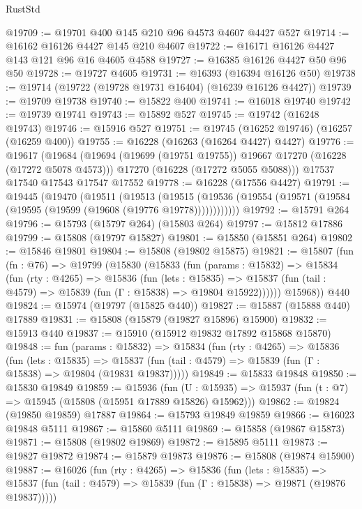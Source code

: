 \begin{lexlean}{RustStd}
\begin{coremodule}
@19709 := @19701 @400 @145 @210 @96 @4573 @4607 @4427 @527
@19714 := @16162 @16126 @4427 @145 @210 @4607
@19722 := @16171 @16126 @4427 @143 @121 @96 @16 @4605 @4588
@19727 := @16385 @16126 @4427 @50 @96 @50
@19728 := @19727 @4605
@19731 := @16393 (@16394 @16126 @50)
@19738 := @19714 (@19722 (@19728 @19731 @16404) (@16239 @16126 @4427))
@19739 := @19709 @19738
@19740 := @15822 @400
@19741 := @16018 @19740
@19742 := @19739 @19741
@19743 := @15892 @527
@19745 := @19742 (@16248 @19743)
@19746 := @15916 @527
@19751 := @19745 (@16252 @19746) (@16257 (@16259 @400))
@19755 := @16228 (@16263 (@16264 @4427) @4427)
@19776 := @19617
    (@19684
      (@19694 (@19699 (@19751 @19755)) @19667 @17270 (@16228 (@17272 @5078 @4573)))
      @17270
      (@16228 (@17272 @5055 @5088)))
    @17537
    @17540
    @17543
    @17547
    @17552
@19778 := @16228 (@17556 @4427)
@19791 := @19445
    (@19470
      (@19511
        (@19513
          (@19515 (@19536 (@19554 (@19571 (@19584 (@19595 (@19599 (@19608 (@19776 @19778))))))))))))
@19792 := @15791 @264
@19796 := @15793 (@15797 @264) (@15803 @264)
@19797 := @15812 @17886
@19799 := @15808 (@19797 @15827)
@19801 := @15850 (@15851 @264)
@19802 := @15846 @19801
@19804 := @15808 (@19802 @15875)
@19821 := @15807
    (fun (fn : @76) =>
    @19799
      (@15830
        (@15833
          (fun (params : @15832) =>
          @15834
            (fun (rty : @4265) =>
            @15836
              (fun (lets : @15835) =>
              @15837 (fun (tail : @4579) => @15839 (fun (Γ : @15838) => @19804 @15922))))))
        @15968))
    @440
@19824 := @15974 (@19797 (@15825 @440))
@19827 := @15887 (@15888 @440) @17889
@19831 := @15808 (@15879 (@19827 @15896) @15900)
@19832 := @15913 @440
@19837 := @15910 (@15912 @19832 @17892 @15868 @15870)
@19848 := fun (params : @15832) =>
  @15834
    (fun (rty : @4265) =>
    @15836
      (fun (lets : @15835) =>
      @15837 (fun (tail : @4579) => @15839 (fun (Γ : @15838) => @19804 (@19831 @19837)))))
@19849 := @15833 @19848
@19850 := @15830 @19849
@19859 := @15936
    (fun (U : @15935) => @15937 (fun (t : @7) => @15945 (@15808 (@15951 @17889 @15826) @15962)))
@19862 := @19824 (@19850 @19859) @17887
@19864 := @15793 @19849 @19859
@19866 := @16023 @19848 @5111
@19867 := @15860 @5111
@19869 := @15858 (@19867 @15873)
@19871 := @15808 (@19802 @19869)
@19872 := @15895 @5111
@19873 := @19827 @19872
@19874 := @15879 @19873
@19876 := @15808 (@19874 @15900)
@19887 := @16026
    (fun (rty : @4265) =>
    @15836
      (fun (lets : @15835) =>
      @15837 (fun (tail : @4579) => @15839 (fun (Γ : @15838) => @19871 (@19876 @19837)))))

\end{coremodule}
\end{lexlean}

